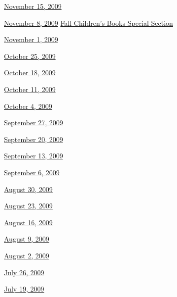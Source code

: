 \href{http://www.nytimes3xbfgragh.onion/indexes/2009/11/14/books/review/index.html}{November
15, 2009}

\href{http://www.nytimes3xbfgragh.onion/indexes/2009/11/07/books/review/index.html}{November
8, 2009} \textbar{}
\href{http://www.nytimes3xbfgragh.onion/indexes/2009/11/07/arts/artsspecial/index.html}{Fall
Children's Books Special Section}

\href{http://www.nytimes3xbfgragh.onion/indexes/2009/10/31/books/review/index.html}{November
1, 2009}

\href{http://www.nytimes3xbfgragh.onion/indexes/2009/10/24/books/review/index.html}{October
25, 2009}

\href{http://www.nytimes3xbfgragh.onion/indexes/2009/10/17/books/review/index.html}{October
18, 2009}

\href{http://www.nytimes3xbfgragh.onion/indexes/2009/10/10/books/review/index.html}{October
11, 2009}

\href{http://www.nytimes3xbfgragh.onion/indexes/2009/10/03/books/review/index.html}{October
4, 2009}

\href{http://www.nytimes3xbfgragh.onion/indexes/2009/09/26/books/review/index.html}{September
27, 2009}

\href{http://www.nytimes3xbfgragh.onion/indexes/2009/09/19/books/review/index.html}{September
20, 2009}

\href{http://www.nytimes3xbfgragh.onion/indexes/2009/09/12/books/review/index.html}{September
13, 2009}

\href{http://www.nytimes3xbfgragh.onion/indexes/2009/09/05/books/review/index.html}{September
6, 2009}

\href{http://www.nytimes3xbfgragh.onion/indexes/2009/08/29/books/review/index.html}{August
30, 2009}

\href{http://www.nytimes3xbfgragh.onion/indexes/2009/08/22/books/review/index.html}{August
23, 2009}

\href{http://www.nytimes3xbfgragh.onion/indexes/2009/08/15/books/review/index.html}{August
16, 2009}

\href{http://www.nytimes3xbfgragh.onion/indexes/2009/08/08/books/review/index.html}{August
9, 2009}

\href{http://www.nytimes3xbfgragh.onion/indexes/2009/08/04/books/review/index.html}{August
2, 2009}

\href{http://www.nytimes3xbfgragh.onion/indexes/2009/07/25/books/review/index.html}{July
26, 2009}

\href{http://www.nytimes3xbfgragh.onion/indexes/2009/07/18/books/review/index.html}{July
19, 2009}

